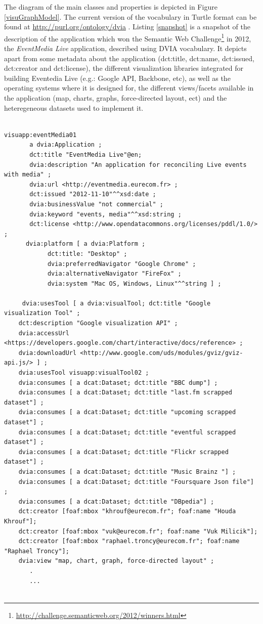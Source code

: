 The diagram of the main classes and properties is depicted in Figure \ref{visuGraphModel}. The current version of the vocabulary in Turtle format can be found at \url{http://purl.org/ontology/dvia} .  Listing \ref{snapshot} is a snapshot of the description of the application which won the Semantic Web Challenge\footnote{\url{http://challenge.semanticweb.org/2012/winners.html}} in 2012, the \textit{EventMedia Live} application, described using DVIA vocabulary. It depicts apart from some metadata about the application (dct:title, dct:name, dct:issued, dct:creator and dct:license), the different visualization libraries integrated for building Eventedia Live (e.g.: Google API, Backbone, etc), as well as the operating systems where it is designed for, the different views/facets available in the application (map, charts, graphs, force-directed layout, ect) and the heteregeneous datasets used to implement it. 
\begin{lstlisting}

visuapp:eventMedia01
       a dvia:Application ; 
       dct:title "EventMedia Live"@en;   
       dvia:description "An application for reconciling Live events with media" ; 
       dvia:url <http://eventmedia.eurecom.fr> ; 
       dct:issued "2012-11-10"^^xsd:date ; 
       dvia:businessValue "not commercial" ;   
       dvia:keyword "events, media"^^xsd:string ; 
       dct:license <http://www.opendatacommons.org/licenses/pddl/1.0/> ; 
      dvia:platform [ a dvia:Platform ; 
			dct:title: "Desktop" ;
			dvia:preferredNavigator "Google Chrome" ; 
			dvia:alternativeNavigator "FireFox" ;
			dvia:system "Mac OS, Windows, Linux"^^string ] ; 
		
     dvia:usesTool [ a dvia:visualTool; dct:title "Google visualization Tool" ; 
	dct:description "Google visualization API" ; 
	dvia:accessUrl <https://developers.google.com/chart/interactive/docs/reference> ; 
	dvia:downloadUrl <http://www.google.com/uds/modules/gviz/gviz-api.js/> ] ;
    dvia:usesTool visuapp:visualTool02 ;
    dvia:consumes [ a dcat:Dataset; dct:title "BBC dump"] ; 
    dvia:consumes [ a dcat:Dataset; dct:title "last.fm scrapped dataset"] ;
    dvia:consumes [ a dcat:Dataset; dct:title "upcoming scrapped dataset"] ;
    dvia:consumes [ a dcat:Dataset; dct:title "eventful scrapped dataset"] ;
    dvia:consumes [ a dcat:Dataset; dct:title "Flickr scrapped dataset"] ;
    dvia:consumes [ a dcat:Dataset; dct:title "Music Brainz "] ;
    dvia:consumes [ a dcat:Dataset; dct:title "Foursquare Json file"] ;
    dvia:consumes [ a dcat:Dataset; dct:title "DBpedia"] ;
    dct:creator [foaf:mbox "khrouf@eurecom.fr"; foaf:name "Houda Khrouf"];
    dct:creator [foaf:mbox "vuk@eurecom.fr"; foaf:name "Vuk Milicik"];
    dct:creator [foaf:mbox "raphael.troncy@eurecom.fr"; foaf:name "Raphael Troncy"];
    dvia:view "map, chart, graph, force-directed layout" ; 
       .
	   ...
	
\end{lstlisting}

